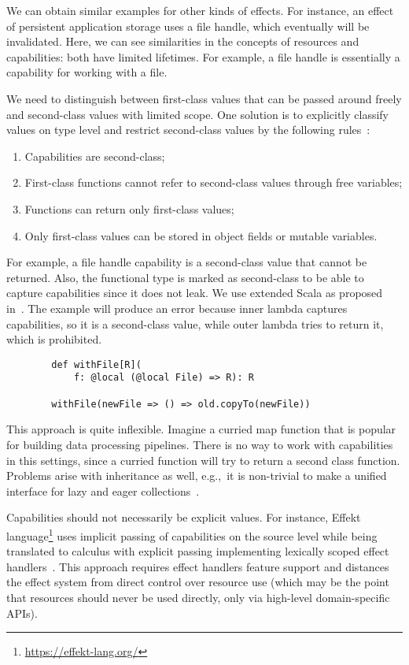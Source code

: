 \documentclass[conference]{IEEEtran}
\begin{document}
    We can obtain similar examples for other kinds of effects.
    For instance, an effect of persistent application storage uses a file handle, which eventually will be invalidated.
    Here, we can see similarities in the concepts of resources and capabilities: both have limited lifetimes.
    For example, a file handle is essentially a capability for working with a file.

    We need to distinguish between first-class values that can be passed around freely and second-class values with limited scope.
    One solution is to explicitly classify values on type level and restrict second-class values by the following rules~\cite{osvald2016gentrification}:
    \begin{enumerate}
        \item Capabilities are second-class;
        \item First-class functions cannot refer to second-class values through free variables;
        \item Functions can return only first-class values;
        \item Only first-class values can be stored in object fields or mutable variables.
    \end{enumerate}

    For example, a file handle capability is a second-class value that cannot be returned.
    Also, the functional type is marked as second-class to be able to capture capabilities since it does not leak.
    We use extended Scala as proposed in~\cite{osvald2016gentrification}.
    The example will produce an error because inner lambda captures capabilities, so it is a second-class value, while outer lambda tries to return it, which is prohibited.
    \begin{verbatim}
        def withFile[R](
            f: @local (@local File) => R): R

        withFile(newFile => () => old.copyTo(newFile))
    \end{verbatim}

    This approach is quite inflexible.
    Imagine a curried map function that is popular for building data processing pipelines.
    There is no way to work with capabilities in this settings, since a curried function will try to return a second class function.
    Problems arise with inheritance as well, e.g.,\ it is non-trivial to make a unified interface for lazy and eager collections~\cite{osvald2016gentrification}.

    Capabilities should not necessarily be explicit values.
    For instance, Effekt language\footnote{\url{https://effekt-lang.org/}} uses implicit passing of capabilities on the source level while being translated to calculus with explicit passing implementing lexically scoped effect handlers~\cite{brachthauser2020effects}.
    This approach requires effect handlers feature support and distances the effect system from direct control over resource use (which may be the point that resources should never be used directly, only via high-level domain-specific APIs).
\end{document}
